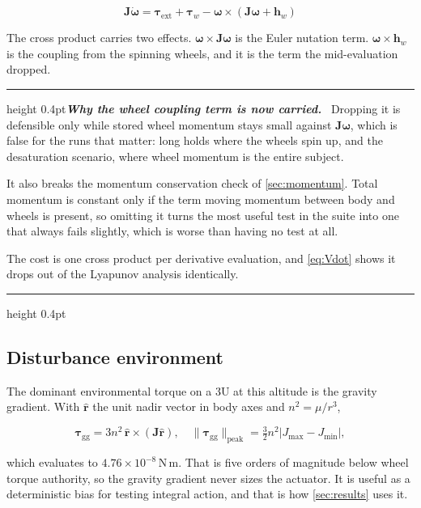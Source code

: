 \documentclass[conference,10pt,a4paper]{IEEEtran}
\newcommand{\remarkrule}{\par\nobreak\vspace{2pt}%
  \hrule height 0.4pt\vspace{4pt}\nobreak}
\newenvironment{designbox}[1][Design decision]
  {\par\medskip\remarkrule\noindent\small\textbf{\textit{#1.}}\ \ignorespaces}
  {\par\vspace{3pt}\hrule height 0.4pt\par\medskip\ignorespacesafterend}
\newenvironment{eqbox}{\ignorespaces}{\ignorespacesafterend}
\newcommand{\vect}[1]{\bm{#1}}
\newcommand{\mat}[1]{\bm{#1}}
\newcommand{\unit}[1]{\ensuremath{\,\mathrm{#1}}}
\begin{document}
\begin{eqbox}
\begin{equation}
\mat{J}\dot{\vect{\omega}}
= \vect{\tau}_\text{ext} + \vect{\tau}_w
- \vect{\omega}\times\!\left(\mat{J}\vect{\omega} + \vect{h}_w\right)
\label{eq:dynamics}
\end{equation}
\end{eqbox}

The cross product carries two effects. $\vect{\omega}\times\mat{J}\vect{\omega}$
is the Euler nutation term. $\vect{\omega}\times\vect{h}_w$ is the coupling
from the spinning wheels, and it is the term the mid-evaluation dropped.

\begin{designbox}[Why the wheel coupling term is now carried]
Dropping it is defensible only while stored wheel momentum stays small against
$\mat{J}\vect{\omega}$, which is false for the runs that matter: long holds
where the wheels spin up, and the desaturation scenario, where wheel momentum
is the entire subject.

It also breaks the momentum conservation check of \cref{sec:momentum}. Total
momentum is constant only if the term moving momentum between body and wheels
is present, so omitting it turns the most useful test in the suite into one
that always fails slightly, which is worse than having no test at all.

The cost is one cross product per derivative evaluation, and
\cref{eq:Vdot} shows it drops out of the Lyapunov analysis identically.
\end{designbox}

\subsection{Disturbance environment}
\label{sec:disturbance}

The dominant environmental torque on a 3U at this altitude is the gravity
gradient. With $\hat{\vect{r}}$ the unit nadir vector in body axes and
$n^2=\mu/r^3$,

\begin{equation}
\vect{\tau}_\text{gg} = 3n^2\,\hat{\vect{r}}\times\!\left(\mat{J}\hat{\vect{r}}\right),
\quad
\|\vect{\tau}_\text{gg}\|_\text{peak}
= \tfrac{3}{2}n^2\left|J_\text{max}-J_\text{min}\right|,
\label{eq:gg}
\end{equation}

which evaluates to $4.76\times10^{-8}\unit{N\,m}$. That is five orders of
magnitude below wheel torque authority, so the gravity gradient never sizes the
actuator. It is useful as a deterministic bias for testing integral action, and
that is how \cref{sec:results} uses it.
\end{document}
